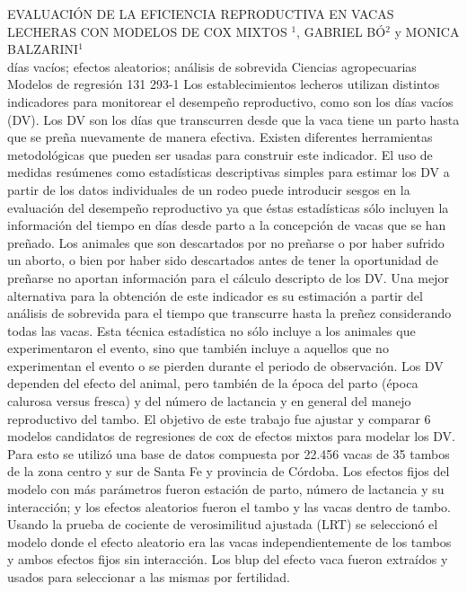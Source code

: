 \A
{EVALUACIÓN DE LA EFICIENCIA REPRODUCTIVA EN VACAS LECHERAS CON MODELOS DE COX MIXTOS}
{$^1$, GABRIEL BÓ$^2$ y MONICA BALZARINI$^1$}
{
\\}
{días vacíos; efectos aleatorios; análisis de sobrevida} 
 {Ciencias agropecuarias} 
 {Modelos de regresión} 
 {131} 
 {293-1}
{Los establecimientos lecheros utilizan distintos indicadores para monitorear el desempeño reproductivo, como son los días vacíos (DV). Los DV son los días que transcurren desde que la vaca tiene un parto hasta que se preña nuevamente de manera efectiva. Existen diferentes herramientas metodológicas que pueden ser usadas para construir este indicador. El uso de medidas resúmenes como estadísticas descriptivas simples para estimar los DV a partir de los datos individuales de un rodeo puede introducir sesgos en la evaluación del desempeño reproductivo ya que éstas estadísticas sólo incluyen la información del tiempo en días desde parto a la concepción de vacas que se han preñado. Los animales que son descartados por no preñarse o por haber sufrido un aborto, o bien por haber sido descartados antes de tener la oportunidad de preñarse no aportan información para el cálculo descripto de los DV. Una mejor alternativa para la obtención de este indicador es su estimación a partir del análisis de sobrevida para el tiempo que transcurre hasta la preñez considerando todas las vacas. Esta técnica estadística no sólo incluye a los animales que experimentaron el evento, sino que también incluye a aquellos que no experimentan el evento o se pierden durante el periodo de observación. Los DV dependen del efecto del animal, pero también de la época del parto (época calurosa versus fresca) y del número de lactancia y en general del manejo reproductivo del tambo. El objetivo de este trabajo fue ajustar y comparar 6 modelos candidatos de regresiones de cox de efectos mixtos para modelar los DV. Para esto se utilizó una base de datos compuesta por 22.456 vacas de 35 tambos de la zona centro y sur de Santa Fe y provincia de Córdoba. Los efectos fijos del modelo con más parámetros fueron estación de parto, número de lactancia y su interacción; y los efectos aleatorios fueron el tambo y las vacas dentro de tambo. Usando la prueba de cociente de verosimilitud ajustada (LRT) se seleccionó el modelo donde el efecto aleatorio era las vacas independientemente de los tambos y ambos efectos fijos sin interacción. Los blup del efecto vaca fueron extraídos y usados para seleccionar a las mismas por fertilidad.}

